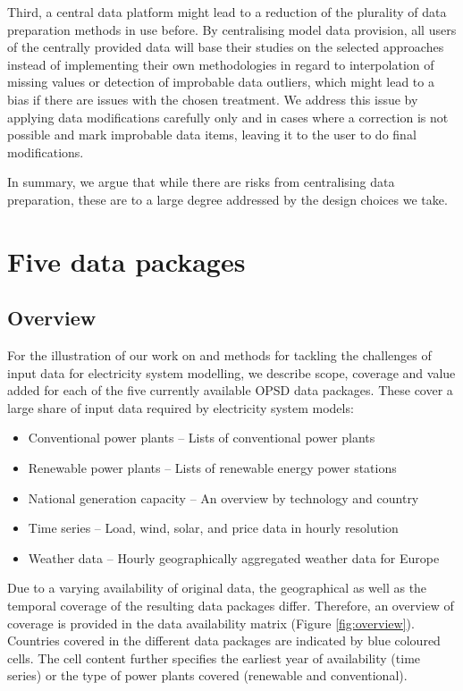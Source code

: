 \documentclass[article,sort&compress]{elsarticle}
\begin{document}
Third, a central data platform might lead to a reduction of the plurality of data preparation methods in use before. By centralising model data provision, all users of the centrally provided data will base their studies on the selected approaches instead of implementing their own methodologies in regard to interpolation of missing values or detection of improbable data outliers, which might lead to a bias if there are issues with the chosen treatment. We address this issue by applying data modifications carefully only and in cases where a correction is not possible and mark improbable data items, leaving it to the user to do final modifications.

In summary, we argue that while there are risks from centralising data preparation, these are to a large degree addressed by the design choices we take.




\section{Five data packages}
\label{sec:packages}
\subsection{Overview}
For the illustration of our work on and methods for tackling the challenges of input data for electricity system modelling, we describe scope, coverage and value added for each of the five currently available OPSD data packages. These cover a large share of input data required by electricity system models:
\begin{itemize}
    \item Conventional power plants -- Lists of conventional power plants 
    \item Renewable power plants -- Lists of renewable energy power stations
    \item National generation capacity -- An overview by technology and country
    \item Time series -- Load, wind, solar, and price data in hourly resolution
    \item Weather data -- Hourly geographically aggregated weather data for Europe
\end{itemize}

Due to a varying availability of original data, the geographical as well as the temporal coverage of the resulting data packages differ. Therefore, an overview of coverage is provided in the data availability matrix (Figure \ref{fig:overview}). Countries covered in the different data packages are indicated by blue coloured cells. The cell content further specifies the earliest year of availability (time series) or the type of power plants covered (renewable and conventional).
\end{document}
